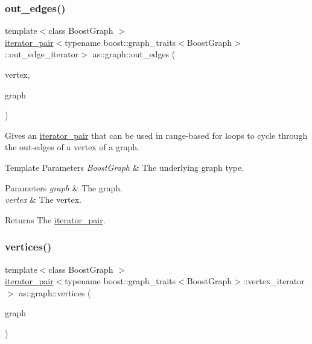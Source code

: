 \subsubsection{\texorpdfstring{out\+\_\+edges()}{out\_edges()}}
{\footnotesize\ttfamily template$<$class Boost\+Graph $>$ \\
\hyperlink{classas_1_1iterator__pair}{iterator\+\_\+pair}$<$typename boost\+::graph\+\_\+traits$<$Boost\+Graph$>$\+::out\+\_\+edge\+\_\+iterator$>$ as\+::graph\+::out\+\_\+edges (\begin{DoxyParamCaption}\item[{const typename boost\+::graph\+\_\+traits$<$ Boost\+Graph $>$\+::vertex\+\_\+descriptor \&}]{vertex,  }\item[{const Boost\+Graph \&}]{graph }\end{DoxyParamCaption})\hspace{0.3cm}{\ttfamily [inline]}}



Gives an \hyperlink{classas_1_1iterator__pair}{iterator\+\_\+pair} that can be used in range-\/based for loops to cycle through the out-\/edges of a vertex of a graph. 


\begin{DoxyTemplParams}{Template Parameters}
{\em Boost\+Graph} & The underlying graph type. \\
\hline
\end{DoxyTemplParams}

\begin{DoxyParams}{Parameters}
{\em graph} & The graph. \\
\hline
{\em vertex} & The vertex. \\
\hline
\end{DoxyParams}
\begin{DoxyReturn}{Returns}
The \hyperlink{classas_1_1iterator__pair}{iterator\+\_\+pair}. 
\end{DoxyReturn}
\mbox{\label{namespaceas_1_1graph_ab93ee208eb116d3a3349c8de8cc91445}} 
\subsubsection{\texorpdfstring{vertices()}{vertices()}}
{\footnotesize\ttfamily template$<$class Boost\+Graph $>$ \\
\hyperlink{classas_1_1iterator__pair}{iterator\+\_\+pair}$<$typename boost\+::graph\+\_\+traits$<$Boost\+Graph$>$\+::vertex\+\_\+iterator$>$ as\+::graph\+::vertices (\begin{DoxyParamCaption}\item[{const Boost\+Graph \&}]{graph }\end{DoxyParamCaption})\hspace{0.3cm}{\ttfamily [inline]}}



